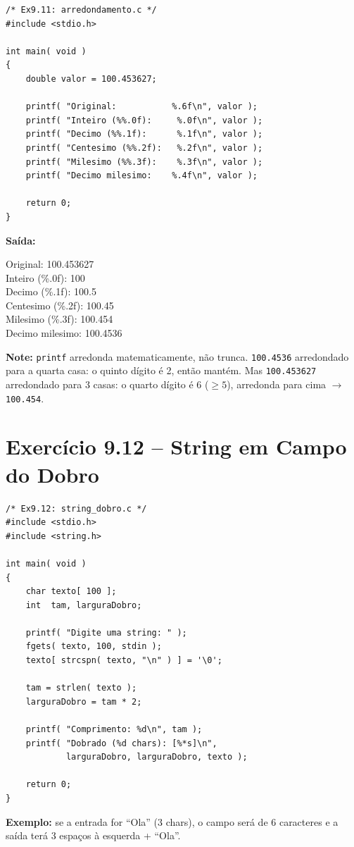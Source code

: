 \documentclass[12pt,a4paper]{article}
\begin{document}
\begin{respostabox}
\begin{lstlisting}
/* Ex9.11: arredondamento.c */
#include <stdio.h>

int main( void )
{
    double valor = 100.453627;

    printf( "Original:           %.6f\n", valor );
    printf( "Inteiro (%%.0f):     %.0f\n", valor );
    printf( "Decimo (%%.1f):      %.1f\n", valor );
    printf( "Centesimo (%%.2f):   %.2f\n", valor );
    printf( "Milesimo (%%.3f):    %.3f\n", valor );
    printf( "Decimo milesimo:    %.4f\n", valor );

    return 0;
}
\end{lstlisting}

\textbf{Saída:}
\begin{saida}
Original:           100.453627\\
Inteiro (\%.0f):     100\\
Decimo (\%.1f):      100.5\\
Centesimo (\%.2f):   100.45\\
Milesimo (\%.3f):    100.454\\
Decimo milesimo:    100.4536
\end{saida}

\textbf{Note:} \texttt{printf} arredonda matematicamente, não trunca.
\texttt{100.4536} arredondado para a quarta casa: o quinto dígito é 2, então mantém.
Mas \texttt{100.453627} arredondado para 3 casas: o quarto dígito é 6 ($\geq 5$),
arredonda para cima $\to$ \texttt{100.454}.
\end{respostabox}

\section{Exercício 9.12 -- String em Campo do Dobro}

\begin{respostabox}
\begin{lstlisting}
/* Ex9.12: string_dobro.c */
#include <stdio.h>
#include <string.h>

int main( void )
{
    char texto[ 100 ];
    int  tam, larguraDobro;

    printf( "Digite uma string: " );
    fgets( texto, 100, stdin );
    texto[ strcspn( texto, "\n" ) ] = '\0';

    tam = strlen( texto );
    larguraDobro = tam * 2;

    printf( "Comprimento: %d\n", tam );
    printf( "Dobrado (%d chars): [%*s]\n",
            larguraDobro, larguraDobro, texto );

    return 0;
}
\end{lstlisting}

\textbf{Exemplo:} se a entrada for ``Ola'' (3 chars), o campo será de 6 caracteres
e a saída terá 3 espaços à esquerda + ``Ola''.
\end{respostabox}
\end{document}
